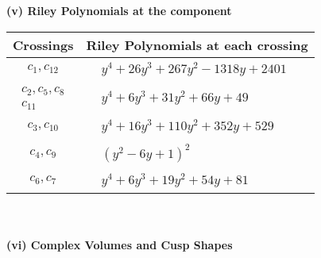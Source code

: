 \documentclass[1p]{elsarticle_modified}
\theoremstyle{definition}
\begin{document}
\newpage\renewcommand{\arraystretch}{1}
\flushleft \textbf{(v) Riley Polynomials at the component}\newline \\
\begin{tabular}{m{50pt}|m{274pt}}
Crossings & \hspace{64pt}Riley Polynomials at each crossing \\
\hline $$\begin{aligned}c_{1},c_{12}\end{aligned}$$&$\begin{aligned}
&y^4+26 y^3+267 y^2-1318 y+2401
\end{aligned}$\\
\hline $$\begin{aligned}c_{2},c_{5},c_{8}\\c_{11}\end{aligned}$$&$\begin{aligned}
&y^4+6 y^3+31 y^2+66 y+49
\end{aligned}$\\
\hline $$\begin{aligned}c_{3},c_{10}\end{aligned}$$&$\begin{aligned}
&y^4+16 y^3+110 y^2+352 y+529
\end{aligned}$\\
\hline $$\begin{aligned}c_{4},c_{9}\end{aligned}$$&$\begin{aligned}
&(y^2-6 y+1)^2
\end{aligned}$\\
\hline $$\begin{aligned}c_{6},c_{7}\end{aligned}$$&$\begin{aligned}
&y^4+6 y^3+19 y^2+54 y+81
\end{aligned}$\\
\hline
\end{tabular}\\~\\
\newpage\flushleft \textbf{(vi) Complex Volumes and Cusp Shapes}
\end{document}
